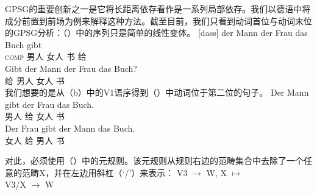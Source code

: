 GPSG的重要创新之一是它将长距离依存看作是一系列局部依存\citep{Gazdar81a}。我们以德语中将成分前置到前场为例来解释这种方法。截至目前，我们只看到动词首位与动词末位的GPSG分析：（）中的序列只是简单的线性变体。
\eal
\ex 
\gll {}[dass] der Mann der Frau das Buch gibt\\
	 {}\spacebr{}\textsc{comp}  男人  女人  书 给\\
\ex 
\gll Gibt der Mann der Frau das Buch?\\
	 给  男人  女人  书\\
\zl
我们想要的是从（b）中的V1语序得到（）中动词位于第二位的句子。
\eal
\ex 
\gll Der Mann gibt der Frau das Buch.\\
      男人 给   女人  书\\
\ex 
\gll Der Frau gibt der Mann das Buch.\\
      女人 给  男人  书\\
\zl

\noindent
对此，必须使用（）中的元规则。该元规则从规则右边的范畴集合中去除了一个任意的范畴X，并在左边用斜杠（`/'）\isce{/}{/}来表示：
\ea
\label{meta-slash-intro}
V3  $\to$ W, X $\mapsto$\\
V3/X  $\to$ W
\z

